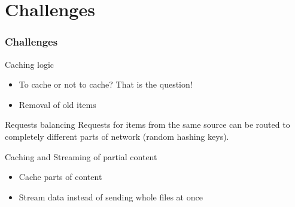\documentclass{beamer}
\begin{document}
\section{Challenges}
\begin{frame}
\frametitle{Challenges}

\begin{block}{Caching logic}
\begin{itemize}
  \item To cache or not to cache? That is the question!
  \item Removal of old items 
\end{itemize}
\end{block}

\pause
\begin{block}{Requests balancing}
Requests for items from the same source can be routed to completely different 
parts of network (random hashing keys).
\end{block}

\pause
\begin{block}{Caching and Streaming of partial content}
\begin{itemize}
  \item Cache parts of content
  \item Stream data instead of sending whole files at once
\end{itemize}
\end{block}

\end{frame}
\end{document}
